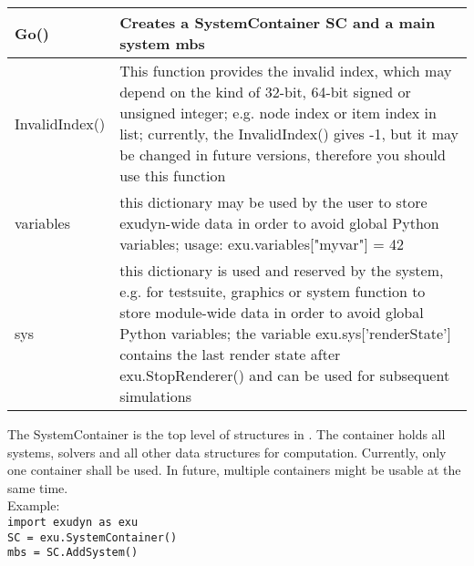 \begin{center}
\begin{longtable}{| p{8cm} | p{8cm} |}
  Go() & Creates a SystemContainer SC and a main system mbs\\ \hline 
  InvalidIndex() & This function provides the invalid index, which may depend on the kind of 32-bit, 64-bit signed or unsigned integer; e.g. node index or item index in list; currently, the InvalidIndex() gives -1, but it may be changed in future versions, therefore you should use this function\\ \hline 
  variables & this dictionary may be used by the user to store exudyn-wide data in order to avoid global Python variables; usage: exu.variables["myvar"] = 42 \\ \hline  
  sys & this dictionary is used and reserved by the system, e.g. for testsuite, graphics or system function to store module-wide data in order to avoid global Python variables; the variable exu.sys['renderState'] contains the last render state after exu.StopRenderer() and can be used for subsequent simulations \\ \hline  
\end{longtable}
\end{center}

The SystemContainer is the top level of structures in \codeName. The container holds all systems, solvers and all other data structures for computation. Currently, only one container shall be used. In future, multiple containers might be usable at the same time. \\ Example: \\ \texttt{import exudyn as exu \\ SC = exu.SystemContainer() \\ mbs = SC.AddSystem()}

